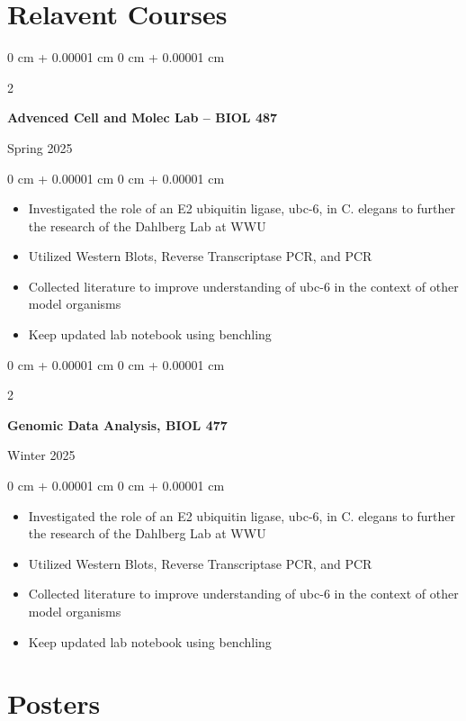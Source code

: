\documentclass[10pt, letterpaper]{article}
\newenvironment{highlights}{
    \begin{itemize}[
        topsep=0.10 cm,
        parsep=0.10 cm,
        partopsep=0pt,
        itemsep=0pt,
        leftmargin=0 cm + 10pt
    ]
}{
    \end{itemize}
} %
\newenvironment{onecolentry}{
    \begin{adjustwidth}{
        0 cm + 0.00001 cm
    }{
        0 cm + 0.00001 cm
    }
}{
    \end{adjustwidth}
} %
\newenvironment{twocolentry}[2][]{
    \onecolentry
    \def\secondColumn{#2}
    \setcolumnwidth{\fill, 4.5 cm}
    \begin{paracol}{2}
}{
    \switchcolumn \raggedleft \secondColumn
    \end{paracol}
    \endonecolentry
} %
\begin{document}
    \section{Relavent Courses}

    \begin{samepage}
    \begin{twocolentry}
      {Spring 2025}
      \textbf{Advenced Cell and Molec Lab -- BIOL 487}
    \end{twocolentry}
      \begin{onecolentry}
        \begin{highlights}
        \item Investigated the role of an E2 ubiquitin ligase, ubc-6, in C. elegans to further the research of the Dahlberg Lab at WWU
        \item Utilized Western Blots, Reverse Transcriptase PCR, and PCR
        \item Collected literature to improve understanding of ubc-6 in the context of other model organisms
        \item Keep updated lab notebook using benchling
        \end{highlights}
      \end{onecolentry}

    \begin{twocolentry}
      {Winter 2025}
      \textbf{Genomic Data Analysis, BIOL 477}
    \end{twocolentry}
      \begin{onecolentry}
        \begin{highlights}
        \item Investigated the role of an E2 ubiquitin ligase, ubc-6, in C. elegans to further the research of the Dahlberg Lab at WWU
        \item Utilized Western Blots, Reverse Transcriptase PCR, and PCR
        \item Collected literature to improve understanding of ubc-6 in the context of other model organisms
        \item Keep updated lab notebook using benchling
        \end{highlights}
      \end{onecolentry}

    \end{samepage}

    \section{Posters}
\end{document}
